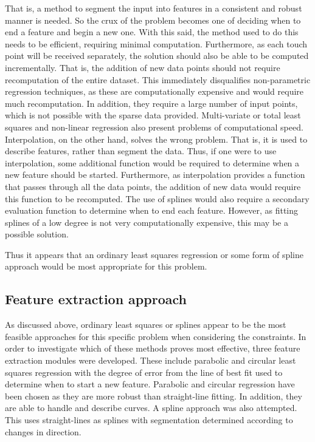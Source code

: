 That is, a method to segment the input into features in a consistent and robust manner is needed. So the crux of the problem becomes one of deciding when to end a feature and begin a new one. With this said, the method used to do this needs to be efficient, requiring minimal computation. Furthermore, as each touch point will be received separately, the solution should also be able to be computed incrementally. That is, the addition of new data points should not require recomputation of the entire dataset. This immediately disqualifies non-parametric regression techniques, as these are computationally expensive and would require much recomputation. In addition, they require a large number of input points, which is not possible with the sparse data provided. Multi-variate or total least squares and non-linear regression also present problems of computational speed. Interpolation, on the other hand, solves the wrong problem. That is, it is used to describe features, rather than segment the data. Thus, if one were to use interpolation, some additional function would be required to determine when a new feature should be started. Furthermore, as interpolation provides a function that passes through all the data points, the addition of new data would require this function to be recomputed. The use of splines would also require a secondary evaluation function to determine when to end each feature. However, as fitting splines of a low degree is not very computationally expensive, this may be a possible solution. 

Thus it appears that an ordinary least squares regression or some form of spline approach would be most appropriate for this problem. 

\subsection{Feature extraction approach}
As discussed above, ordinary least squares or splines appear to be the most feasible approaches for this specific problem when considering the constraints. In order to investigate which of these methods proves most effective, three feature extraction modules were developed. These include parabolic and circular least squares regression with the degree of error from the line of best fit used to determine when to start a new feature. Parabolic and circular regression have been chosen as they are more robust than straight-line fitting. In addition, they are able to handle and describe curves. A spline approach was also attempted. This uses straight-lines as splines with segmentation determined according to changes in direction.

